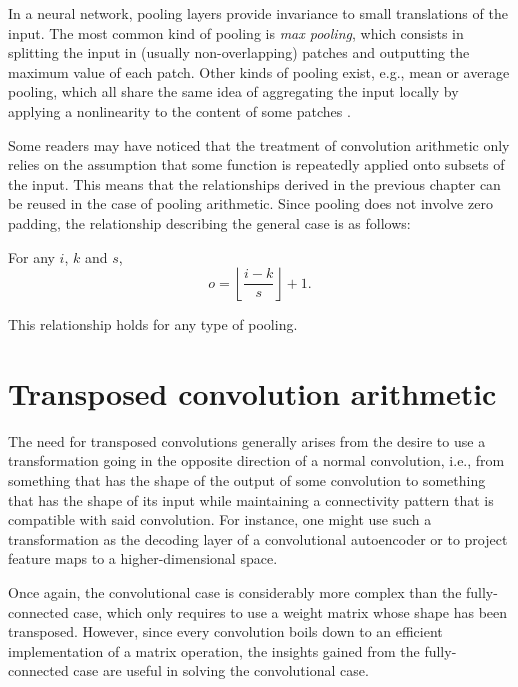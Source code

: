 In a neural network, pooling layers provide invariance to small translations of
the input. The most common kind of pooling is \emph{max pooling}, which
consists in splitting the input in (usually non-overlapping) patches and
outputting the maximum value of each patch. Other kinds of pooling exist, e.g.,
mean or average pooling, which all share the same idea of aggregating the input
locally by applying a nonlinearity to the content of some patches \citep{%
boureau-cvpr-10,boureau-icml-10,boureau-iccv-11,ICML2011Saxe_551}.

Some readers may have noticed that the treatment of convolution arithmetic only
relies on the assumption that some function is repeatedly applied onto subsets
of the input. This means that the relationships derived in the previous chapter
can be reused in the case of pooling arithmetic. Since pooling does not involve
zero padding, the relationship describing the general case is as follows:

\begin{relationship}\label{rel:pooling}
For any $i$, $k$ and $s$,
\begin{equation*}
    o = \left\lfloor \frac{i - k}{s} \right\rfloor + 1.
\end{equation*}
\end{relationship}

\noindent This relationship holds for any type of pooling.

\chapter{Transposed convolution arithmetic}

The need for transposed convolutions generally arises from the desire to use a
transformation going in the opposite direction of a normal convolution, i.e.,
from something that has the shape of the output of some convolution to
something that has the shape of its input while maintaining a connectivity
pattern that is compatible with said convolution. For instance, one might use
such a transformation as the decoding layer of a convolutional autoencoder or to
project feature maps to a higher-dimensional space.

Once again, the convolutional case is considerably more complex than the
fully-connected case, which only requires to use a weight matrix whose shape
has been transposed. However, since every convolution boils down to an
efficient implementation of a matrix operation, the insights gained from the
fully-connected case are useful in solving the convolutional case.

